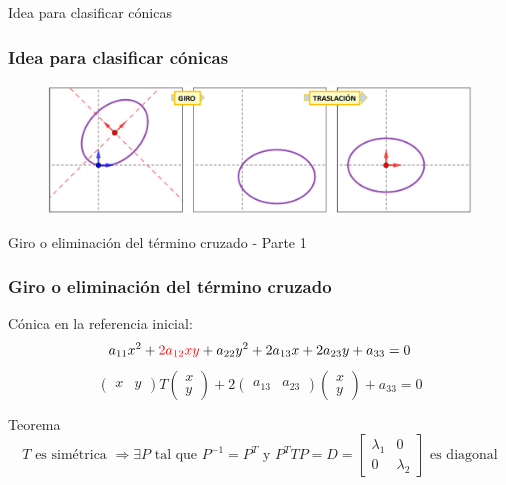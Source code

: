 \documentclass[xcolor={dvipsnames},aspectratio=169,10pt]{beamer}
\begin{document}
\begin{frame}{Idea para clasificar cónicas}
  \frametitle{Idea para clasificar cónicas}
  \begin{figure}
    \includegraphics[width=\textwidth, height=\textheight, keepaspectratio]{images/red.png}
  \end{figure}
\end{frame}

\begin{frame}{Giro o eliminación del término cruzado - Parte 1}
  \frametitle{Giro o eliminación del término cruzado}
  Cónica en la referencia inicial:
  \begin{equation*}
    a_{11}x^2 + \textcolor{red}{2a_{12}xy} + a_{22}y^2 + 2a_{13}x + 2a_{23}y + a_{33} = 0
  \end{equation*}
  \begin{equation*}
    \begin{pmatrix} x & y \end{pmatrix} T \begin{pmatrix} x \\ y \end{pmatrix} + 2\begin{pmatrix} a_{13} & a_{23} \end{pmatrix} \begin{pmatrix} x \\ y \end{pmatrix} + a_{33} = 0
  \end{equation*}
  
  \begin{block}{Teorema}
    \begin{equation*}
      T \text{ es simétrica } \Rightarrow \exists P \text{ tal que } P^{-1} = P^T \text{ y } P^T T P = D = \begin{bmatrix} \lambda_1 & 0 \\ 0 & \lambda_2 \end{bmatrix} \text{ es diagonal}    
    \end{equation*}
  \end{block}
\end{frame}
\end{document}
